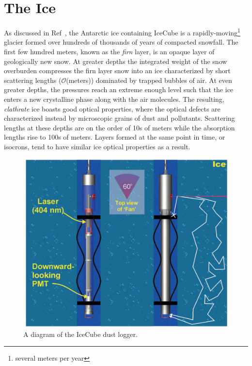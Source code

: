 \documentclass[main.tex]{subfiles}
\begin{document}

\section{The Ice}
As discussed in Ref~\cite{journal_glaciology_2013}, the Antarctic ice containing IceCube is a rapidly-moving\footnote{several meters per year} glacier formed over hundreds of thousands of years of compacted snowfall. 
The first few hundred meters, known as the \textit{firn} layer, is an opaque layer of geologically new snow. 
At greater depths the integrated weight of the snow overburden compresses the firn layer snow into an ice characterized by short scattering lengths ($\mathcal{O}$(meters)) dominated by trapped bubbles of air.
At even greater depths, the pressures reach an extreme enough level such that the ice enters a new crystalline phase along with the air molecules. 
The resulting, \textit{clathrate} ice boasts good optical properties, where the optical defects are characterized instead by microscopic grains of dust and pollutants.
Scattering lengths at these depths are on the order of 10s of meters while the absorption lengths rise to 100s of meters. 
Layers formed at the same point in time, or isocrons, tend to have similar ice optical properties as a result. 

\begin{figure}
    \centering
    \includegraphics[width=0.6\linewidth]{figures/dustlog.png}
    \caption{A diagram of the IceCube dust logger.}\label{fig:dustlog}
\end{figure}
\end{document}
